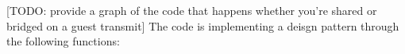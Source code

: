 \documentclass[11pt,pdftex,twocolumn]{article}
\begin{document}
[TODO: provide a graph of the code that happens whether you're shared or bridged on a guest transmit]
The code is implementing a deisgn pattern through the following functions: 
%
%
%
%
%
%
%
%
%








{\footnotesize 
}
\end{document}
